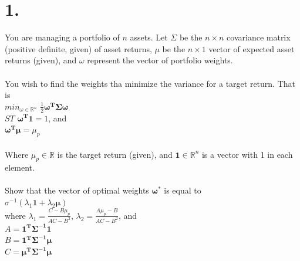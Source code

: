 \documentclass{article}
\begin{document}
\thispagestyle{firstpageheader}

\section*{1.}
{\Large 

You are managing a portfolio of $n$ assets. Let $\Sigma$ be the $n \times n$ covariance matrix (positive definite, given) of asset returns, $\mu$ be the $n \times 1$ vector of expected asset returns (given), and $\omega$ represent the vector of portfolio weights. \\ \\
You wish to find the weights tha minimize the variance for a target return. That is \\
$min_{\omega \in \mathbb{R}^n }$ $\frac{1}{2}\mathbf{\omega^T \Sigma \omega}$ \\
$ST$ $\mathbf{\omega^T1} = 1$, and \\
$\mathbf{\omega^T\mu} = \mu_p$ \\ \\
Where $\mu_p \in \mathbb{R}$ is the target return (given), and $\mathbf{1} \in \mathbb{R}^n$ is a vector with 1 in each element. \\ \\
Show that the vector of optimal weights $\mathbf{\omega}^*$ is equal to \\
$\sigma^{-1}(\lambda_1\mathbf{1} + \lambda_2\mathbf{\mu})$ \\
where $\lambda_1 = \frac{C - B\mu_p}{AC - B^2}$, $\lambda_2 = \frac{A\mu_p - B}{AC - B^2}$, and \\
$A = \mathbf{1^T\Sigma^{-1}1}$ \\
$B = \mathbf{1^T\Sigma^{-1}\mu}$ \\
$C = \mathbf{\mu^T\Sigma^{-1}\mu}$ \\



\newpage
}
\end{document}
